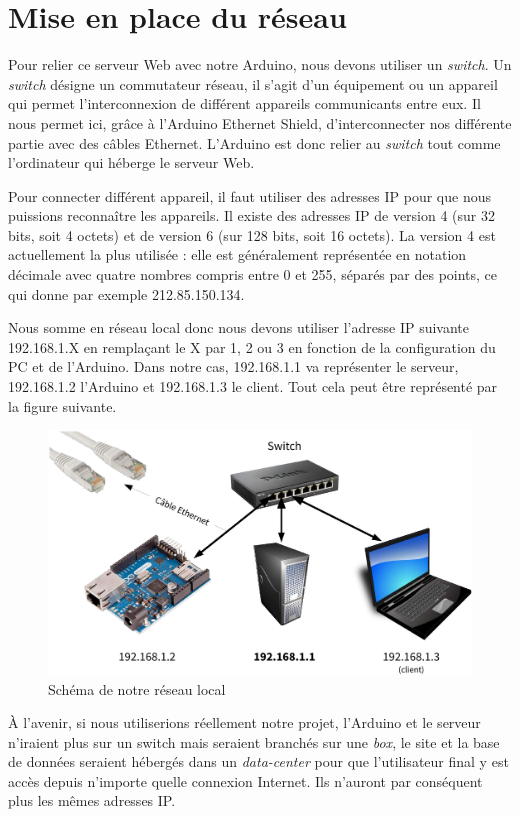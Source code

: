\section{Mise en place du réseau}

Pour relier ce serveur Web avec notre Arduino, nous devons utiliser un \emph{switch}. Un \emph{switch} désigne un commutateur réseau, il s'agit d'un équipement ou un appareil qui permet l'interconnexion de différent appareils communicants entre eux. Il nous permet ici, grâce à l'Arduino Ethernet Shield, d'interconnecter nos différente partie avec des câbles Ethernet. L'Arduino est donc relier au \emph{switch} tout comme l'ordinateur qui héberge le serveur Web.

Pour connecter différent appareil, il faut utiliser des adresses IP pour que nous puissions reconnaître les appareils. Il existe des adresses IP de version 4 (sur 32 bits, soit 4 octets) et de version 6 (sur 128 bits, soit 16 octets). La version 4 est actuellement la plus utilisée : elle est généralement représentée en notation décimale avec quatre nombres compris entre 0 et 255, séparés par des points, ce qui donne par exemple 212.85.150.134.

Nous somme en réseau local donc nous devons utiliser l'adresse IP suivante 192.168.1.X en remplaçant le X par 1, 2 ou 3 en fonction de la configuration du PC et de l'Arduino. Dans notre cas, 192.168.1.1 va représenter le serveur, 192.168.1.2 l'Arduino et 192.168.1.3 le client. Tout cela peut être représenté par la figure suivante.

\begin{figure}[!h]
	\centering
	\includegraphics[width=.8\linewidth]{Images/Schema_reseau}
	\caption{Schéma de notre réseau local}
\end{figure}

À l'avenir, si nous utiliserions réellement notre projet, l'Arduino et le serveur n'iraient plus sur un switch mais seraient branchés sur une \emph{box}, le site et la base de données seraient hébergés dans un \emph{data-center} pour que l'utilisateur final y est accès depuis n'importe quelle connexion Internet. Ils n'auront par conséquent plus les mêmes adresses IP.
